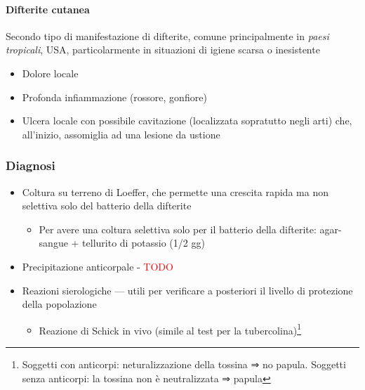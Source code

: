 \documentclass[italian,]{article}
\providecommand{\tightlist}{%
  \setlength{\itemsep}{0pt}\setlength{\parskip}{0pt}}
\newcommand{\asidefigure}[2]{\marginpar{\phantom{Img:}\newline\texttt{[image: \#1]}\\\footnotesize\emph{#2}}}
\newcommand{\TODO}[1]{\textcolor{red}{\textsf{\footnotesize{TODO #1}}}} %
\begin{document}
\hypertarget{difterite-cutanea}{%
\paragraph{Difterite cutanea}\label{difterite-cutanea}}

\footnotesize

Secondo tipo di manifestazione di difterite, comune principalmente in
\emph{paesi tropicali}, USA, particolarmente in situazioni di igiene
scarsa o inesistente \normalsize

\begin{itemize}
\tightlist
\item
  Dolore locale
\item
  Profonda infiammazione (rossore, gonfiore)
\item
  Ulcera locale con possibile cavitazione (localizzata sopratutto negli
  arti) che, all'inizio, assomiglia ad una lesione da ustione
  \asidefigure{img/difterite-cutanea.png}{}
\end{itemize}

\hypertarget{diagnosi-9}{%
\subsubsection{Diagnosi}\label{diagnosi-9}}

\begin{itemize}
\tightlist
\item
  Coltura su terreno di Loeffer, che permette una crescita rapida ma non
  selettiva solo del batterio della difterite

  \begin{itemize}
  \tightlist
  \item
    Per avere una coltura selettiva solo per il batterio della
    difterite: agar-sangue + tellurito di potassio (1/2 gg)
  \end{itemize}
\item
  Precipitazione anticorpale - \TODO{}
\item
  Reazioni sierologiche --- utili per verificare a posteriori il livello
  di protezione della popolazione

  \begin{itemize}
  \tightlist
  \item
    Reazione di Schick in vivo (simile al test per la
    tubercolina)\footnote{Soggetti con anticorpi: neturalizzazione della
      tossina ⇒ no papula. Soggetti senza anticorpi: la tossina non è
      neutralizzata ⇒ papula}
  \end{itemize}
\end{itemize}
\end{document}
